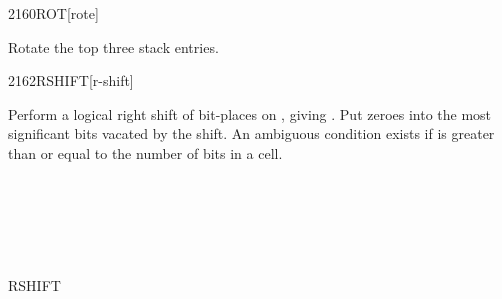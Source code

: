 \begin{worddef}{2160}{ROT}[rote]
\item {}

	Rotate the top three stack entries.

	\begin{testing} %
	\end{testing}
\end{worddef}


\begin{worddef}{2162}{RSHIFT}[r-shift]
\item {}

	Perform a logical right shift of  bit-places on
	, giving . Put zeroes into the most
	significant bits vacated by the shift. An ambiguous condition
	exists if  is greater than or equal to the number of
	bits in a cell.

	\begin{testing} %
		 \\
		 \\
		 \\
		 \\
								\tab[7]   \\
		 \tab[1]  RSHIFT  \\
	\end{testing}
\end{worddef}


